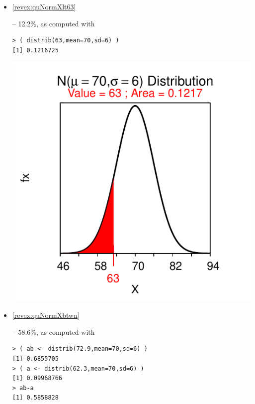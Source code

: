 \documentclass[10pt,openany]{book}\usepackage[]{graphicx}\usepackage[]{color}
\makeatletter
\newenvironment{kframe}{%
 \def\at@end@of@kframe{}%
 \ifinner\ifhmode%
  \def\at@end@of@kframe{\end{minipage}}%
  \begin{minipage}{\columnwidth}%
 \fi\fi%
 \def\FrameCommand##1{\hskip\@totalleftmargin \hskip-\fboxsep
 \colorbox{shadecolor}{##1}\hskip-\fboxsep
     \hskip-\linewidth \hskip-\@totalleftmargin \hskip\columnwidth}%
 \MakeFramed {\advance\hsize-\width
   \@totalleftmargin\z@ \linewidth\hsize
   \@setminipage}}%
 {\par\unskip\endMakeFramed%
 \at@end@of@kframe}
\newenvironment{knitrout}{}{} %
\makeatother
\begin{document}
\begin{itemize}
\begin{knitrout}
{}



\end{knitrout}
  \item \hypertarget{ans:quNormXlt63}{\ref{revex:quNormXlt63}} -- 12.2\%, as computed with
\begin{knitrout}
\color{fgcolor}\begin{kframe}
\begin{verbatim}
> ( distrib(63,mean=70,sd=6) )
[1] 0.1216725
\end{verbatim}
\end{kframe}

{\centering \includegraphics[width=.4\linewidth]{Figs/unnamed-chunk-219-1} 

}



\end{knitrout}
  \item \hypertarget{ans:quNormXbtwn}{\ref{revex:quNormXbtwn}} --  58.6\%, as computed with
\begin{knitrout}
\color{fgcolor}\begin{kframe}
\begin{verbatim}
> ( ab <- distrib(72.9,mean=70,sd=6) )
[1] 0.6855705
> ( a <- distrib(62.3,mean=70,sd=6) )
[1] 0.09968766
> ab-a
[1] 0.5858828
\end{verbatim}
\end{kframe}


\end{knitrout}
\end{itemize}
\end{document}
